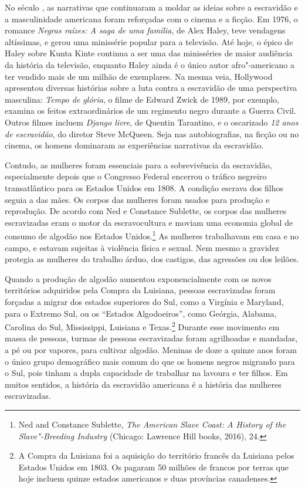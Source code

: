 No século , as narrativas que continuaram a moldar as ideias sobre a
escravidão e a masculinidade americana foram reforçadas com o cinema e a
ficção. Em 1976, o romance \emph{Negras raízes: A saga de uma família},
de Alex Haley, teve vendagens altíssimas, e gerou uma minissérie popular para a
televisão. Até hoje, o épico de Haley sobre Kunta Kinte continua a ser
uma das minisséries de maior audiência da história da televisão,
enquanto Haley ainda é o único autor afro"-americano a ter vendido mais
de um milhão de exemplares. Na mesma veia, Hollywood apresentou diversas
histórias sobre a luta contra a escravidão de uma perspectiva masculina:
\emph{Tempo de glória}, o filme de Edward Zwick de 1989, por exemplo,
examina os feitos extraordinários de um regimento negro durante a Guerra
Civil. Outros filmes incluem \emph{Django livre}, de Quentin Tarantino,
e o oscarizado \emph{12 anos de escravidão}, do diretor Steve McQueen.
Seja nas autobiografias, na ficção ou no cinema, os homens dominaram as
experiências narrativas da escravidão.

Contudo, as mulheres foram essenciais para a sobrevivência da
escravidão, especialmente depois que o Congresso Federal encerrou o
tráfico negreiro transatlântico para os Estados Unidos em 1808. A
condição escrava dos filhos seguia a das mães. Os corpos das mulheres
foram usados para produção e reprodução. De acordo com Ned e Constance
Sublette, os corpos das mulheres escravizadas eram o motor da
escravocultura e moviam uma economia global de consumo de algodão nos
Estados Unidos.\footnote{Ned and Constance Sublette, \emph{The American
  Slave Coast: A History of the Slave"-Breeding Industry} (Chicago:
  Lawrence Hill books, 2016), 24.} As mulheres trabalhavam em casa e no
campo, e estavam sujeitas à violência física e sexual. Nem mesmo a
gravidez protegia as mulheres do trabalho árduo, dos castigos, das
agressões ou dos leilões.

Quando a produção de algodão aumentou exponencialmente com os novos
territórios adquiridos pela Compra da Luisiana, pessoas escravizadas
foram forçadas a migrar dos estados superiores do Sul, como a Virgínia e
Maryland, para o Extremo Sul, ou os ``Estados Algodoeiros'', como
Geórgia, Alabama, Carolina do Sul, Mississippi, Luisiana e
Texas.\footnote{A Compra da Luisiana foi a aquisição do território
  francês da Luisiana pelos Estados Unidos em 1803. Os  pagaram 50
  milhões de francos por terras que hoje incluem quinze estados
  americanos e duas províncias canadenses.} Durante esse movimento em
massa de pessoas, turmas de pessoas escravizadas foram agrilhoadas e
mandadas, a pé ou por vapores, para cultivar algodão. Meninas de doze a
quinze anos foram o único grupo demográfico mais comum do que os homens
negros migrando para o Sul, pois tinham a dupla capacidade de trabalhar
na lavoura e ter filhos. Em muitos sentidos, a história da escravidão
americana é a história das mulheres escravizadas.

